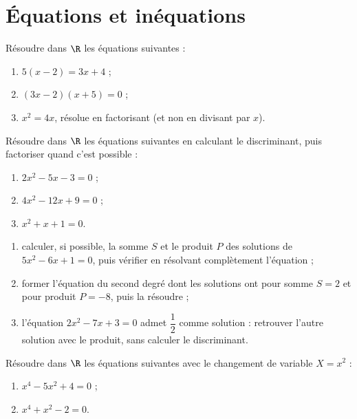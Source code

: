 \clearpage
\chapter{Équations et inéquations}

\begin{exercice}
Résoudre dans $\R$ les équations suivantes :
\begin{enumerate}
\item $5(x - 2) = 3x + 4$ ;
\item $(3x - 2)(x + 5) = 0$ ;
\item $x^{2} = 4x$, résolue en factorisant (et non en divisant par $x$).
\end{enumerate}
\end{exercice}

\begin{exercice}
Résoudre dans $\R$ les équations suivantes en calculant le discriminant, puis factoriser quand c'est possible :
\begin{enumerate}
\item $2x^{2} - 5x - 3 = 0$ ;
\item $4x^{2} - 12x + 9 = 0$ ;
\item $x^{2} + x + 1 = 0$.
\end{enumerate}
\end{exercice}

\begin{exercice}
\begin{enumerate}
\item calculer, si possible, la somme $S$ et le produit $P$ des solutions de $5x^{2} - 6x + 1 = 0$, puis vérifier en résolvant complètement l'équation ;
\item former l'équation du second degré dont les solutions ont pour somme $S = 2$ et pour produit $P = -8$, puis la résoudre ;
\item l'équation $2x^{2} - 7x + 3 = 0$ admet $\dfrac{1}{2}$ comme solution : retrouver l'autre solution avec le produit, sans calculer le discriminant.
\end{enumerate}
\end{exercice}

\begin{exercice}
Résoudre dans $\R$ les équations suivantes avec le changement de variable $X = x^{2}$ :
\begin{enumerate}
\item $x^{4} - 5x^{2} + 4 = 0$ ;
\item $x^{4} + x^{2} - 2 = 0$.
\end{enumerate}
\end{exercice}

